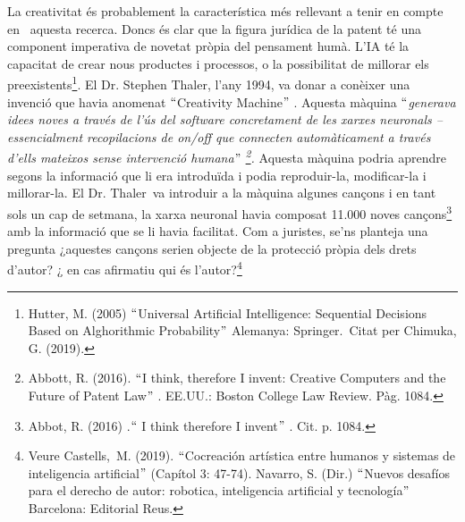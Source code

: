 \documentclass[12pt]{article}
\renewcommand{\_}{\kern-1.5pt\textunderscore\kern-1.5pt}
\begin{document}
\begin{itemize}
\vspace{\baselineskip}
La creativitat és probablement la característica més rellevant a tenir en compte en \  aquesta recerca. Doncs és clar que la figura jurídica de la patent té una component imperativa de novetat pròpia del pensament humà. L’IA té la capacitat de crear nous productes i processos, o la possibilitat de millorar els preexistents\footnote{ Hutter, M. (2005) $``$Universal Artificial Intelligence: Sequential Decisions Based on Alghorithmic Probability$"$  Alemanya: Springer.\ Citat per  Chimuka, G. (2019). }. El Dr. Stephen Thaler, l’any 1994, va donar a conèixer una invenció que havia anomenat $``$Creativity Machine$"$ . Aquesta màquina $``$\textit{generava idees noves a través de l’ús del software concretament de les xarxes neuronals – essencialment recopilacions de on/off que connecten automàticament a través d’ells mateixos sense intervenció humana$"$ \footnote{ Abbott, R. (2016). $``$I think, therefore I invent: Creative Computers and the Future of Patent Law$"$ . EE.UU.: Boston College Law Review. Pàg. 1084.  }. }Aquesta màquina podria aprendre segons la informació que li era introduïda i podia reproduir-la, modificar-la i millorar-la. El Dr. Thaler\ va introduir a la màquina algunes cançons i en  tant sols un cap de setmana, la xarxa neuronal havia composat 11.000 noves cançons\footnote{ Abbot, R. (2016) .$``$ I think therefore I invent$"$ . Cit. p. 1084.  } amb la informació que se li havia facilitat. Com a juristes, se’ns planteja una pregunta ¿aquestes cançons serien objecte de la protecció pròpia dels drets d’autor? ¿ en cas afirmatiu qui és l’autor?\footnote{ Veure Castells,\ M. (2019).  $``$Cocreación artística entre humanos y sistemas de inteligencia artificial$"$  (Capítol 3: 47-74). Navarro, S. (Dir.) $``$Nuevos desafíos para el derecho de autor: robotica, inteligencia artificial y tecnología$"$  Barcelona: Editorial Reus.  }{\fontsize{10pt}{12.0pt}\selectfont  \par}\par



\end{itemize}
\end{document}
